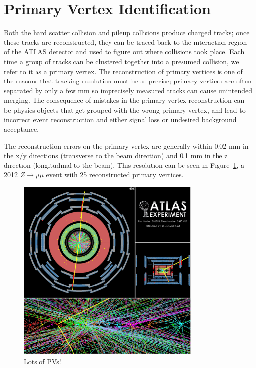 \section{Primary Vertex Identification}
\label{sec:pv}
Both the hard scatter collision and pileup collisions produce charged tracks; once these tracks are reconstructed, they can be traced back to the interaction region of the ATLAS detector and used to figure out where collisions took place.  Each time a group of tracks can be clustered together into a presumed collision, we refer to it as a primary vertex.  The reconstruction of primary vertices is one of the reasons that tracking resolution must be so precise; primary vertices are often separated by only a few mm so imprecisely measured tracks can cause unintended merging.  The consequence of mistakes in the primary vertex reconstruction can be physics objects that get grouped with the wrong primary vertex, and lead to incorrect event reconstruction and either signal loss or undesired background acceptance.

The reconstruction errors on the primary vertex are generally within 0.02 mm in the x/y directions (transverse to the beam direction) and 0.1 mm in the z direction (longitudinal to the beam).   This resolution can be seen in Figure~\ref{fig:pileup_pv}, a 2012 $Z\rightarrow\mu\mu$ event with 25 reconstructed primary vertices.


\begin{figure}
	\includegraphics[width=0.8\textwidth]{ReconstructionPerformance/images/2012_highPileup.pdf}
	\caption{Lots of PVs! 	\label{fig:pileup_pv}  }
\end{figure}


